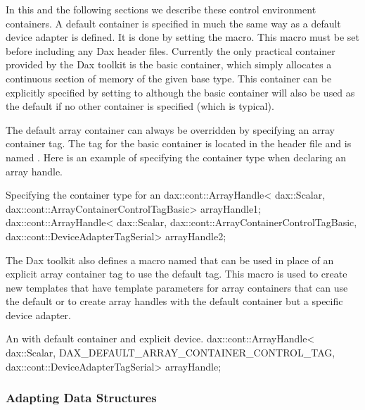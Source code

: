 In this and the following sections we describe these control environment
containers. A default container is specified in much the same way as a
default device adapter is defined. It is done by setting the
 macro. This macro must be set
before including any Dax header files. Currently the only practical
container provided by the Dax toolkit is the basic container, which simply
allocates a continuous section of memory of the given base type. This
container can be explicitly specified by setting
 to
 although the basic
container will also be used as the default if no other container is
specified (which is typical).

The default array container can always be overridden by specifying an array
container tag. The tag for the basic container is located in the
 header file and is named
. Here is an example of specifying
the container type when declaring an array handle.

\begin{daxexample}{Specifying the container type for an }
dax::cont::ArrayHandle<
  dax::Scalar,
  dax::cont::ArrayContainerControlTagBasic> arrayHandle1;
dax::cont::ArrayHandle<
  dax::Scalar,
  dax::cont::ArrayContainerControlTagBasic,
  dax::cont::DeviceAdapterTagSerial> arrayHandle2;
\end{daxexample}

The Dax toolkit also defines a macro named
 that can be used in
place of an explicit array container tag to use the default tag. This macro
is used to create new templates that have template parameters for array
containers that can use the default or to create array handles with the
default container but a specific device adapter.

\begin{daxexample}{An  with default container and explicit device.}
dax::cont::ArrayHandle<
  dax::Scalar,
  DAX_DEFAULT_ARRAY_CONTAINER_CONTROL_TAG,
  dax::cont::DeviceAdapterTagSerial> arrayHandle;
\end{daxexample}


\subsubsection{Adapting Data Structures}

